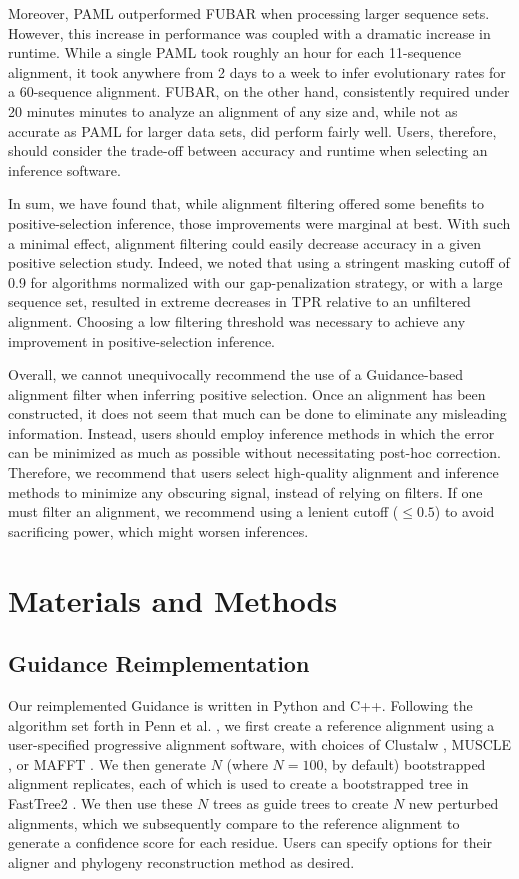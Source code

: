 \documentclass[11pt]{article}
\begin{document}
Moreover, PAML outperformed FUBAR when processing larger sequence sets. However, this increase in performance was coupled with a dramatic increase in runtime. While a single PAML took roughly an hour for each 11-sequence alignment, it took anywhere from 2 days to a week to infer evolutionary rates for a 60-sequence alignment. FUBAR, on the other hand, consistently required under 20 minutes minutes to analyze an alignment of any size and, while not as accurate as PAML for larger data sets, did perform fairly well. Users, therefore, should consider the trade-off between accuracy and runtime when selecting an inference software. 

In sum, we have found that, while alignment filtering offered some benefits to positive-selection inference, those improvements were marginal at best. With such a minimal effect, alignment filtering could easily decrease accuracy in a given positive selection study. Indeed, we noted that using a stringent masking cutoff of 0.9 for algorithms normalized with our gap-penalization strategy, or with a large sequence set, resulted in extreme decreases in TPR relative to an unfiltered alignment. Choosing a low filtering threshold was necessary to achieve any improvement in positive-selection inference.  

Overall, we cannot unequivocally recommend the use of a Guidance-based alignment filter when inferring positive selection. Once an alignment has been constructed, it does not seem that much can be done to eliminate any misleading information. Instead, users should employ inference methods in which the error can be minimized as much as possible without necessitating post-hoc correction. Therefore, we recommend that users select high-quality alignment and inference methods to minimize any obscuring signal, instead of relying on filters. If one must filter an alignment, we recommend using a lenient cutoff ($\leq0.5$) to avoid sacrificing power, which might worsen inferences.


\section*{Materials and Methods}

\subsection*{Guidance Reimplementation}
Our reimplemented Guidance is written in Python and C++. Following the algorithm set forth in Penn et al. \citep{Penn2010}, we first create a reference alignment using a user-specified progressive alignment software, with choices of Clustalw \citep{Thompson1994}, MUSCLE \citep{Edgar2004}, or MAFFT \citep{Katoh2002, Katoh2005}. We then generate $N$ (where $N=100$, by default) bootstrapped alignment replicates, each of which is used to create a bootstrapped tree in FastTree2 \citep{Price2010}. We then use these $N$ trees as guide trees to create $N$ new perturbed alignments, which we subsequently compare to the reference alignment to generate a confidence score for each residue. Users can specify options for their aligner and phylogeny reconstruction method as desired.
\end{document}
